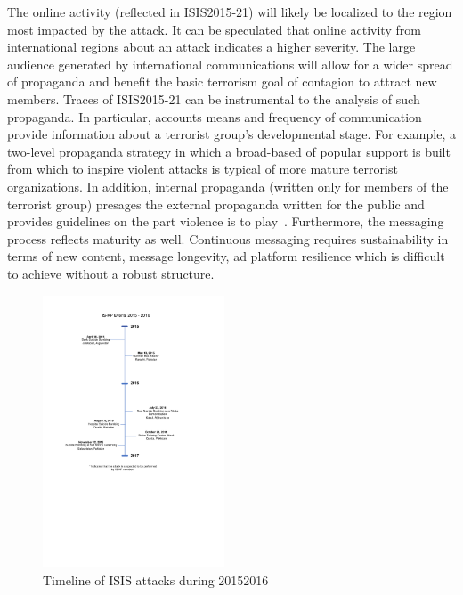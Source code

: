 \documentclass[letterpaper]{article} %
\begin{document}
The online activity (reflected in ISIS2015-21)  will likely be localized to the region most impacted by the attack. It can be speculated that online activity from international regions about an attack indicates a higher severity. The large audience generated by international communications will allow for a wider spread of propaganda and benefit the basic terrorism goal of contagion to attract new members. Traces of ISIS2015-21 can be instrumental to the analysis of such propaganda.  In particular, accounts means and frequency of communication  provide information about a terrorist group's developmental stage. For example, a two-level propaganda strategy in which a broad-based of popular support is built from which to inspire violent attacks is typical of more mature terrorist organizations. In addition, internal propaganda (written only for members of the terrorist group) presages the external propaganda written for the public and provides guidelines on the part violence is to play~\cite{international1975clandestine}. Furthermore, the messaging process reflects maturity as well. Continuous messaging requires sustainability in terms of new content, message longevity, ad platform resilience which is difficult to achieve without a robust structure. 


\begin{figure}[ht]
\includegraphics[width=0.48\textwidth]{img/Timeline2015-2016.pdf}
\caption{Timeline of ISIS attacks during 20152016}
\label{fig:Timeline2015-2016}
\end{figure}
\end{document}
